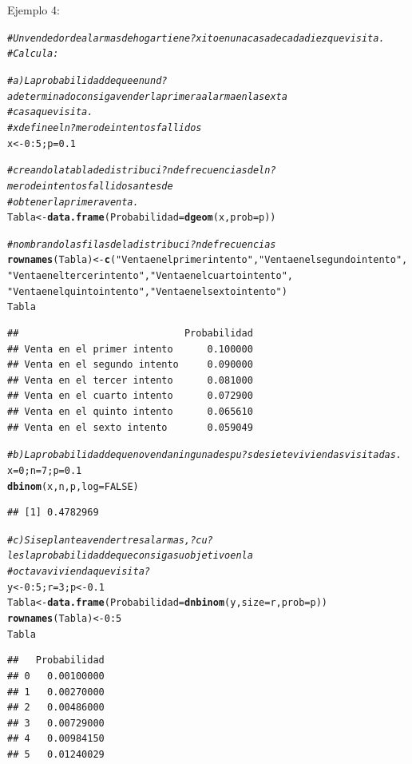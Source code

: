 \documentclass[10pt,a4paper]{article}\usepackage[]{graphicx}\usepackage[]{color}
\makeatletter
\newcommand{\hlnum}[1]{\textcolor[rgb]{0.686,0.059,0.569}{#1}}%
\newcommand{\hlstr}[1]{\textcolor[rgb]{0.192,0.494,0.8}{#1}}%
\newcommand{\hlcom}[1]{\textcolor[rgb]{0.678,0.584,0.686}{\textit{#1}}}%
\newcommand{\hlopt}[1]{\textcolor[rgb]{0,0,0}{#1}}%
\newcommand{\hlstd}[1]{\textcolor[rgb]{0.345,0.345,0.345}{#1}}%
\newcommand{\hlkwb}[1]{\textcolor[rgb]{0.69,0.353,0.396}{#1}}%
\newcommand{\hlkwc}[1]{\textcolor[rgb]{0.333,0.667,0.333}{#1}}%
\newcommand{\hlkwd}[1]{\textcolor[rgb]{0.737,0.353,0.396}{\textbf{#1}}}%
\newenvironment{kframe}{%
 \def\at@end@of@kframe{}%
 \ifinner\ifhmode%
  \def\at@end@of@kframe{\end{minipage}}%
  \begin{minipage}{\columnwidth}%
 \fi\fi%
 \def\FrameCommand##1{\hskip\@totalleftmargin \hskip-\fboxsep
 \colorbox{shadecolor}{##1}\hskip-\fboxsep
     \hskip-\linewidth \hskip-\@totalleftmargin \hskip\columnwidth}%
 \MakeFramed {\advance\hsize-\width
   \@totalleftmargin\z@ \linewidth\hsize
   \@setminipage}}%
 {\par\unskip\endMakeFramed%
 \at@end@of@kframe}
\newenvironment{knitrout}{}{} %
\makeatother
\begin{document}
Ejemplo 4: 
\begin{knitrout}
\color{fgcolor}\begin{kframe}
\begin{alltt}
\hlcom{#Un vendedor de alarmas de hogar tiene ?xito enuna casa de cada diez que visita. }
\hlcom{#Calcula:}

\hlcom{#a) La probabilidad de que en un d?a determinado consiga vender la primera alarma en la sexta }
\hlcom{#casa que visita.}
\hlcom{# x define el n?mero de intentos fallidos }
\hlstd{x} \hlkwb{<-} \hlnum{0}\hlopt{:}\hlnum{5}\hlstd{; p}\hlkwb{=}\hlnum{0.1}

\hlcom{# creando la tabla de distribuci?n de frecuencias del n?mero de intentos fallidos antes de }
\hlcom{#obtener la primera venta. }
\hlstd{Tabla} \hlkwb{<-} \hlkwd{data.frame}\hlstd{(}\hlkwc{Probabilidad}\hlstd{=}\hlkwd{dgeom}\hlstd{(x,} \hlkwc{prob}\hlstd{=p))}

\hlcom{# nombrando las filas de la distribuci?n de frecuencias }
\hlkwd{rownames}\hlstd{(Tabla)} \hlkwb{<-} \hlkwd{c}\hlstd{(}\hlstr{"Venta en el primer intento"}\hlstd{,} \hlstr{"Venta en el segundo intento"}\hlstd{,}
\hlstr{"Venta en el tercer intento"}\hlstd{,} \hlstr{"Venta en el cuarto intento"}\hlstd{,}
\hlstr{"Venta en el quinto intento"}\hlstd{,} \hlstr{"Venta en el sexto intento"}\hlstd{)}
\hlstd{Tabla}
\end{alltt}
\begin{verbatim}
##                             Probabilidad
## Venta en el primer intento      0.100000
## Venta en el segundo intento     0.090000
## Venta en el tercer intento      0.081000
## Venta en el cuarto intento      0.072900
## Venta en el quinto intento      0.065610
## Venta en el sexto intento       0.059049
\end{verbatim}
\begin{alltt}
\hlcom{#b) La probabilidad de que no venda ninguna despu?s de siete viviendas visitadas.}
\hlstd{x}\hlkwb{=}\hlnum{0}\hlstd{; n}\hlkwb{=}\hlnum{7}\hlstd{; p}\hlkwb{=}\hlnum{0.1}
\hlkwd{dbinom}\hlstd{(x, n, p,} \hlkwc{log} \hlstd{=} \hlnum{FALSE}\hlstd{)}
\end{alltt}
\begin{verbatim}
## [1] 0.4782969
\end{verbatim}
\begin{alltt}
\hlcom{#c) Si se plantea vender tres alarmas, ?cu?l es la probabilidad deque consiga su objetivo en la }
\hlcom{#octava vivienda que visita?}
\hlstd{y} \hlkwb{<-} \hlnum{0}\hlopt{:}\hlnum{5}\hlstd{; r}\hlkwb{=}\hlnum{3}\hlstd{; p} \hlkwb{<-} \hlnum{0.1}
\hlstd{Tabla} \hlkwb{<-} \hlkwd{data.frame}\hlstd{(}\hlkwc{Probabilidad}\hlstd{=}\hlkwd{dnbinom}\hlstd{(y,} \hlkwc{size}\hlstd{=r,} \hlkwc{prob}\hlstd{=p))}
\hlkwd{rownames}\hlstd{(Tabla)} \hlkwb{<-} \hlnum{0}\hlopt{:}\hlnum{5}
\hlstd{Tabla}
\end{alltt}
\begin{verbatim}
##   Probabilidad
## 0   0.00100000
## 1   0.00270000
## 2   0.00486000
## 3   0.00729000
## 4   0.00984150
## 5   0.01240029
\end{verbatim}
\end{kframe}
\end{knitrout}
\end{document}
